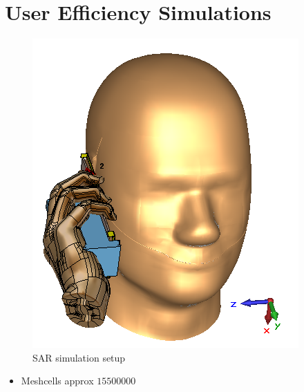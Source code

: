 \chapter{User Efficiency Simulations}

\begin{figure}[htbp]%
  \centering
  \includegraphics{img/tech_sol/monopole/sol1_sar}
  \caption{SAR simulation setup}
  \label{fig:ant1_sar}
\end{figure}

\begin{itemize}
\item Meshcells approx $15500000$
\end{itemize}

